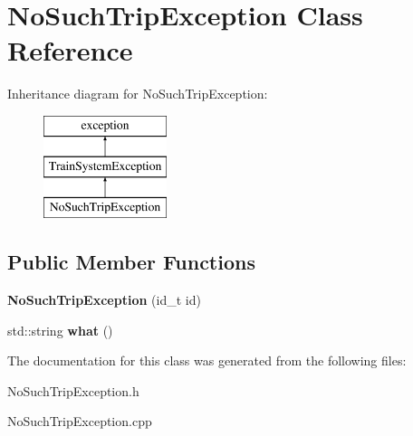 \hypertarget{classNoSuchTripException}{}\section{No\+Such\+Trip\+Exception Class Reference}
\label{classNoSuchTripException}
Inheritance diagram for No\+Such\+Trip\+Exception\+:\begin{figure}[H]
\begin{center}
\leavevmode
\includegraphics[height=3.000000cm]{classNoSuchTripException}
\end{center}
\end{figure}
\subsection*{Public Member Functions}
\begin{DoxyCompactItemize}
\item 
\mbox{\label{classNoSuchTripException_ad4e2e75706508833ccbb7a793092734c}} 
{\bfseries No\+Such\+Trip\+Exception} (id\+\_\+t id)
\item 
\mbox{\label{classNoSuchTripException_aa3688b73cc264a2b19f430501f3131bd}} 
std\+::string {\bfseries what} ()
\end{DoxyCompactItemize}


The documentation for this class was generated from the following files\+:\begin{DoxyCompactItemize}
\item 
No\+Such\+Trip\+Exception.\+h\item 
No\+Such\+Trip\+Exception.\+cpp\end{DoxyCompactItemize}
